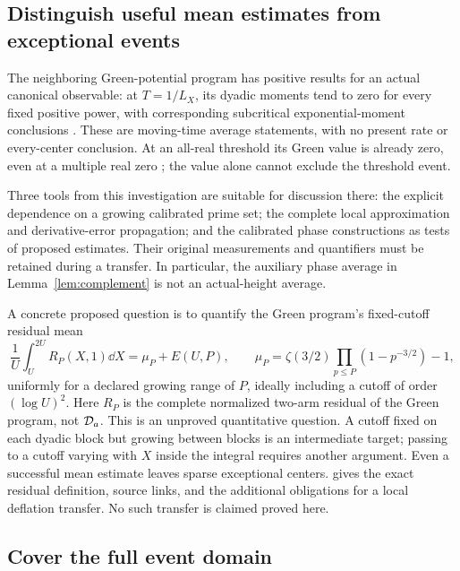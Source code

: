 \subsection{Distinguish useful mean estimates from exceptional events}

The neighboring Green-potential program has positive results for an
actual canonical observable: at \(T=1/L_X\), its dyadic moments tend to
zero for every fixed positive power, with corresponding subcritical
exponential-moment conclusions \cite{gnp19}. These are moving-time
average statements, with no present rate or every-center conclusion.
At an all-real threshold its Green value is already zero, even at a
multiple real zero \cite{gnp20}; the value alone cannot exclude the
threshold event.

Three tools from this investigation are suitable for discussion there:
the explicit dependence on a growing calibrated prime set; the complete
local approximation and derivative-error propagation; and the
calibrated phase constructions as tests of proposed estimates.
Their original measurements and quantifiers must be retained during a
transfer. In particular, the auxiliary phase average in
Lemma~\ref{lem:complement} is not an actual-height average.

A concrete proposed question is to quantify the Green program's
fixed-cutoff residual mean
\[
 \frac1U\int_U^{2U}R_P(X,1)\dd X=\mu_P+E(U,P),
 \qquad
 \mu_P=\zeta(3/2)\prod_{p\le P}(1-p^{-3/2})-1,
\]
uniformly for a declared growing range of \(P\), ideally including a
cutoff of order \((\log U)^2\). Here \(R_P\) is the complete normalized
two-arm residual of the Green program, not \(\mathcal D_a\).
This is an unproved quantitative question. A cutoff fixed on each
dyadic block but growing between blocks is an intermediate target;
passing to a cutoff varying with \(X\) inside the integral requires
another argument. Even a successful mean estimate leaves sparse
exceptional centers.
gives the exact residual definition,
source links, and the additional obligations for a local deflation
transfer. No such transfer is claimed proved here.

\subsection{Cover the full event domain}

